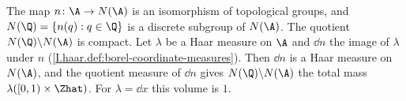 The map $n\colon\A\to N(\A)$ is an isomorphism of topological groups, and $N(\Q)=\{n(q):q\in\Q\}$ is a discrete
subgroup of $N(\A)$. The quotient $N(\Q)\backslash N(\A)$ is compact. Let $\lambda$ be a Haar measure on $\A$ and
$\dd n$ the image of $\lambda$ under $n$ (\cref{I.haar.def:borel-coordinate-measures}). Then $\dd n$ is a Haar measure on
$N(\A)$, and the quotient measure of $\dd n$ gives $N(\Q)\backslash N(\A)$ the total mass $\lambda([0,1)\times\Zhat)$.
For $\lambda=\dd x$ this volume is $1$.
